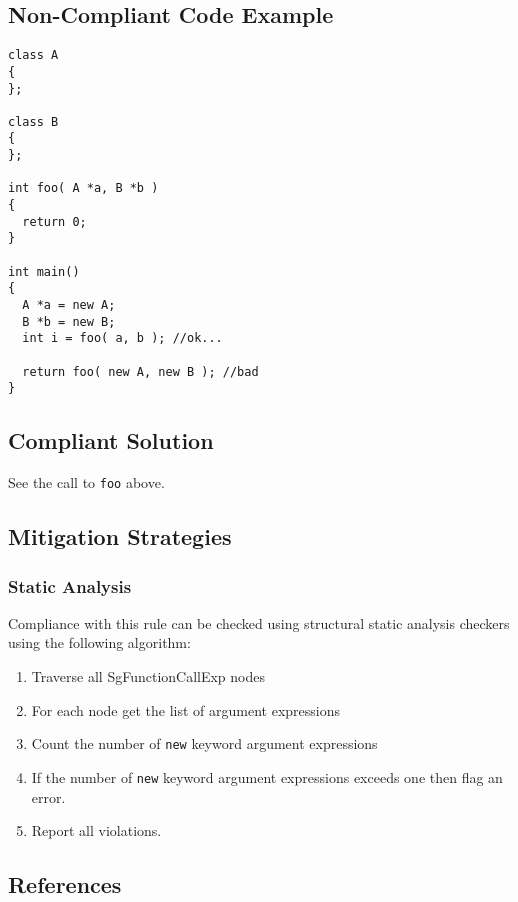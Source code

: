 \subsection{Non-Compliant Code Example}
\begin{verbatim}
class A
{
};

class B
{
};

int foo( A *a, B *b )
{
  return 0;
}

int main()
{
  A *a = new A;
  B *b = new B;
  int i = foo( a, b ); //ok...

  return foo( new A, new B ); //bad
}
\end{verbatim}

\subsection{Compliant Solution}
See the call to {\tt foo} above.

\subsection{Mitigation Strategies}
\subsubsection{Static Analysis} 

Compliance with this rule can be checked using structural static analysis checkers using the following algorithm:

\begin{enumerate}
\item Traverse all SgFunctionCallExp nodes
\item For each node get the list of argument expressions
\item Count the number of {\tt new} keyword argument expressions
\item If the number of {\tt new} keyword argument expressions exceeds one then flag an error.
\item Report all violations.
\end{enumerate}

\subsection{References}
